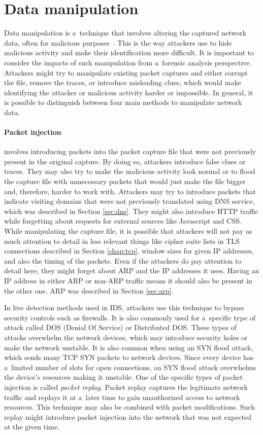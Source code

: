 \documentclass[
  printed,     %
  color,       %
  oneside,     %
  nosansbold,  %
  nocolorbold, %
  nolof,         %
  nolot,         %
]{fithesis4}
\begin{document}
\section{Data manipulation}
\label{sec:manipul}
Data manipulation is a~technique that involves altering the captured network data, often for malicious purposes~\cite{Messier2017-fz}. This is the way attackers use to hide malicious activity and make their identification more difficult. It is important to consider the impacts of such manipulation from a~forensic analysis perspective. Attackers might try to manipulate existing packet captures and either corrupt the file, remove the traces, or introduce misleading clues, which would make identifying the attacker or malicious activity harder or impossible. In general, it is possible to distinguish between four main methods to manipulate network data.

\paragraph{Packet injection} involves introducing packets into the packet capture file that were not previously present in the original capture. By doing so, attackers introduce false clues or traces. They may also try to make the malicious activity look normal or to flood the capture file with unnecessary packets that would just make the file bigger and, therefore, harder to work with. Attackers may try to introduce packets that indicate visiting domains that were not previously translated using DNS service, which was described in Section \ref{sec:dns}. They might also introduce HTTP traffic while forgetting about requests for external sources like Javascript and CSS. While manipulating the capture file, it is possible that attackers will not pay as much attention to detail in less relevant things like cipher suite lists in TLS connections described in Section \ref{chap:tcp}, window sizes for given IP addresses, and also the timing of the packets. Even if the attackers do pay attention to detail here, they might forget about ARP and the IP addresses it uses. Having an IP address in either ARP or non-ARP traffic means it should also be present in the other one. ARP was described in Section \ref{sec:arp}.

In live detection methods used in IDS, attackers use this technique to bypass security controls such as firewalls. It is also commonly used for a~specific type of attack called DOS (Denial Of Service) or Distributed DOS. These types of attacks overwhelm the network devices, which may introduce security holes or make the network unstable. It is also common when using an SYN flood attack, which sends many TCP SYN packets to network devices. Since every device has a~limited number of slots for open connections, an SYN flood attack overwhelms the device's resources making it unstable. One of the specific types of packet injection is called \textit{packet replay}. Packet replay captures the legitimate network traffic and replays it at a~later time to gain unauthorized access to network resources. This technique may also be combined with packet modifications. Such replay might introduce packet injection into the network that was not expected at the given time.
\end{document}
